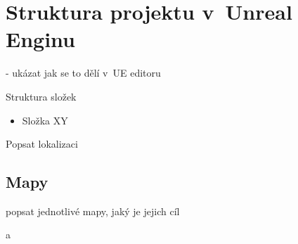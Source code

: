 
\section{Struktura projektu v~Unreal Enginu}

- ukázat jak se to dělí v~UE editoru

Struktura složek

\begin{itemize}
	\item Složka XY
\end{itemize}

Popsat lokalizaci

\subsection{Mapy}

popsat jednotlivé mapy, jaký je jejich cíl

a

